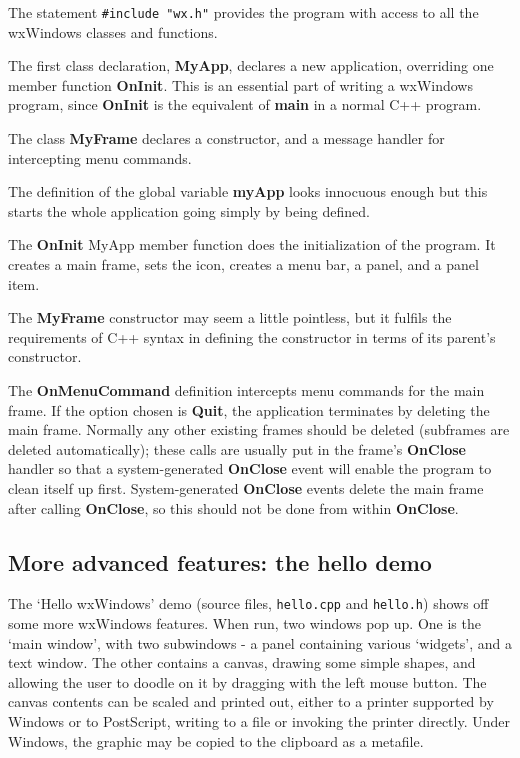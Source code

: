 %

The statement {\tt \#include "wx.h"} provides the program with access to
all the wxWindows classes and functions.

The first class declaration, {\bf MyApp}, declares a new application,
overriding one member function {\bf OnInit}. This is an essential part
of writing a wxWindows program, since {\bf OnInit} is the equivalent of
{\bf main} in a normal C++ program.

The class {\bf MyFrame} declares a constructor, and a message handler
for intercepting menu commands.

The definition of the global variable {\bf myApp} looks innocuous enough
but this starts the whole application going simply by being defined.

The {\bf OnInit} MyApp member function does the initialization of
the program. It creates a main frame, sets the icon,
creates a menu bar, a panel, and a panel item.

The {\bf MyFrame} constructor may seem a little pointless, but it
fulfils the requirements of C++ syntax in defining the constructor in
terms of its parent's constructor.

The {\bf OnMenuCommand} definition intercepts menu commands for the main
frame. If the option chosen is {\bf Quit}, the application terminates by
deleting the main frame. Normally any other existing frames should be
deleted (subframes are deleted automatically); these calls are usually put
in the frame's {\bf OnClose} handler so that a system-generated {\bf
OnClose} event will enable the program to clean itself up first.
System-generated {\bf OnClose} events delete the main frame after calling
{\bf OnClose}, so this should not be done from within {\bf OnClose}.

\subsection{More advanced features: the hello demo}

The `Hello wxWindows' demo (source files, {\tt hello.cpp} and {\tt hello.h})
shows off some more wxWindows features.  When run, two windows pop up.
One is the `main window', with two subwindows - a panel containing
various `widgets', and a text window.  The other contains a canvas,
drawing some simple shapes, and allowing the user to doodle on it by
dragging with the left mouse button.  The canvas contents can be
scaled and printed out, either to a printer supported by Windows or to
PostScript, writing to a file or invoking the printer directly. Under
Windows, the graphic may be copied to the clipboard as a metafile.

